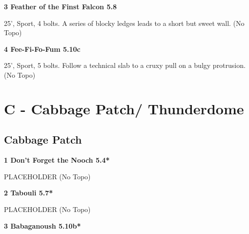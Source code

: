 \begin{multicols}{2}
\needspace{1.5cm}
\label{rt:Feather of the Finst Falcon}
\colorbox{green!20}{
\parbox{0.95\linewidth}{
\textbf{
3 Feather of the Finst Falcon 5.8  
}}}

\begin{adjustwidth}{0.5cm}{}			
25', Sport, 4 bolts. A series of blocky ledges leads to a short but sweet wall. (No Topo)
\end{adjustwidth}



\needspace{1.5cm}
\label{rt:Fee-Fi-Fo-Fum}
\colorbox{RoyalBlue!20}{
\parbox{0.95\linewidth}{
\textbf{
4 Fee-Fi-Fo-Fum 5.10c  
}}}

\begin{adjustwidth}{0.5cm}{}			
25', Sport, 5 bolts. Follow a technical slab to a cruxy pull on a bulgy protrusion. (No Topo)
\end{adjustwidth}




\newpage

\section{C - Cabbage Patch/ Thunderdome}\label{sa:Cabbage Patch/ Thunderdome}




\needspace{1.5cm}
\subsection*{Cabbage Patch}\label{bf:Cabbage Patch}
	


\needspace{1.5cm}
\label{rt:Don't Forget the Nooch}
\colorbox{green!20}{
\parbox{0.95\linewidth}{
\textbf{
1 Don't Forget the Nooch 5.4*  
}}}

\begin{adjustwidth}{0.5cm}{}			
PLACEHOLDER (No Topo)
\end{adjustwidth}



\needspace{1.5cm}
\label{rt:Tabouli}
\colorbox{green!20}{
\parbox{0.95\linewidth}{
\textbf{
2 Tabouli 5.7*  
}}}

\begin{adjustwidth}{0.5cm}{}			
PLACEHOLDER (No Topo)
\end{adjustwidth}



\needspace{1.5cm}
\label{rt:Babaganoush}
\colorbox{RoyalBlue!20}{
\parbox{0.95\linewidth}{
\textbf{
3 Babaganoush 5.10b*  
}}}


\end{multicols}
